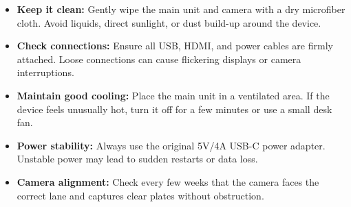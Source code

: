 \begin{itemize}
	\item \textbf{Keep it clean:}  
	Gently wipe the main unit and camera with a dry microfiber cloth.  
	Avoid liquids, direct sunlight, or dust build-up around the device.
	
	\item \textbf{Check connections:}  
	Ensure all USB, HDMI, and power cables are firmly attached.  
	Loose connections can cause flickering displays or camera interruptions.
	
	\item \textbf{Maintain good cooling:}  
	Place the main unit  in a ventilated area.  
	If the device feels unusually hot, turn it off for a few minutes or use a small desk fan.
	
	\item \textbf{Power stability:}  
	Always use the original 5V/4A USB-C power adapter.  
	Unstable power may lead to sudden restarts or data loss.
	
	\item \textbf{Camera alignment:}  
	Check every few weeks that the camera faces the correct lane and captures clear plates without obstruction.
\end{itemize}

